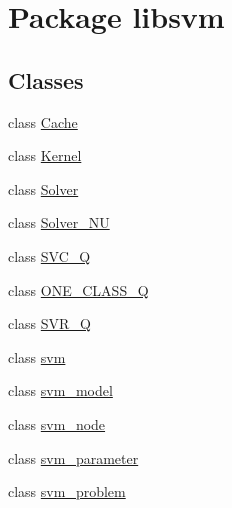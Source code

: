 \hypertarget{namespacelibsvm}{
\section{Package libsvm}
\label{namespacelibsvm}
}
\subsection*{Classes}
\begin{DoxyCompactItemize}
\item 
class \hyperlink{classlibsvm_1_1_cache}{Cache}
\item 
class \hyperlink{classlibsvm_1_1_kernel}{Kernel}
\item 
class \hyperlink{classlibsvm_1_1_solver}{Solver}
\item 
class \hyperlink{classlibsvm_1_1_solver___n_u}{Solver\_\-NU}
\item 
class \hyperlink{classlibsvm_1_1_s_v_c___q}{SVC\_\-Q}
\item 
class \hyperlink{classlibsvm_1_1_o_n_e___c_l_a_s_s___q}{ONE\_\-CLASS\_\-Q}
\item 
class \hyperlink{classlibsvm_1_1_s_v_r___q}{SVR\_\-Q}
\item 
class \hyperlink{classlibsvm_1_1svm}{svm}
\item 
class \hyperlink{classlibsvm_1_1svm__model}{svm\_\-model}
\item 
class \hyperlink{classlibsvm_1_1svm__node}{svm\_\-node}
\item 
class \hyperlink{classlibsvm_1_1svm__parameter}{svm\_\-parameter}
\item 
class \hyperlink{classlibsvm_1_1svm__problem}{svm\_\-problem}
\end{DoxyCompactItemize}
